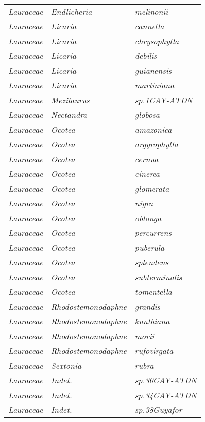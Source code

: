 \documentclass[fleqn,10pt]{ArtEcoFoG} %
\renewenvironment{table}{\begin{table*}}{\end{table*}\ignorespacesafterend}
\begin{document}
\begin{table}
\begin{tabular}[t]{lll}
\addlinespace
\em{Lauraceae} & \em{Endlicheria} & \em{melinonii}\\
\em{Lauraceae} & \em{Licaria} & \em{cannella}\\
\em{Lauraceae} & \em{Licaria} & \em{chrysophylla}\\
\em{Lauraceae} & \em{Licaria} & \em{debilis}\\
\em{Lauraceae} & \em{Licaria} & \em{guianensis}\\
\addlinespace
\em{Lauraceae} & \em{Licaria} & \em{martiniana}\\
\em{Lauraceae} & \em{Mezilaurus} & \em{sp.1CAY-ATDN}\\
\em{Lauraceae} & \em{Nectandra} & \em{globosa}\\
\em{Lauraceae} & \em{Ocotea} & \em{amazonica}\\
\em{Lauraceae} & \em{Ocotea} & \em{argyrophylla}\\
\addlinespace
\em{Lauraceae} & \em{Ocotea} & \em{cernua}\\
\em{Lauraceae} & \em{Ocotea} & \em{cinerea}\\
\em{Lauraceae} & \em{Ocotea} & \em{glomerata}\\
\em{Lauraceae} & \em{Ocotea} & \em{nigra}\\
\em{Lauraceae} & \em{Ocotea} & \em{oblonga}\\
\addlinespace
\em{Lauraceae} & \em{Ocotea} & \em{percurrens}\\
\em{Lauraceae} & \em{Ocotea} & \em{puberula}\\
\em{Lauraceae} & \em{Ocotea} & \em{splendens}\\
\em{Lauraceae} & \em{Ocotea} & \em{subterminalis}\\
\em{Lauraceae} & \em{Ocotea} & \em{tomentella}\\
\addlinespace
\em{Lauraceae} & \em{Rhodostemonodaphne} & \em{grandis}\\
\em{Lauraceae} & \em{Rhodostemonodaphne} & \em{kunthiana}\\
\em{Lauraceae} & \em{Rhodostemonodaphne} & \em{morii}\\
\em{Lauraceae} & \em{Rhodostemonodaphne} & \em{rufovirgata}\\
\em{Lauraceae} & \em{Sextonia} & \em{rubra}\\
\addlinespace
\em{Lauraceae} & \em{Indet.} & \em{sp.30CAY-ATDN}\\
\em{Lauraceae} & \em{Indet.} & \em{sp.34CAY-ATDN}\\
\em{Lauraceae} & \em{Indet.} & \em{sp.38Guyafor}\\

\end{tabular}
\end{table}
\end{document}
